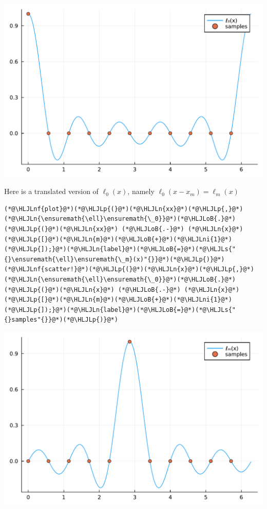 \documentclass[12pt,landscape]{article}
\newcommand{\HLJLn}[1]{#1}
\newcommand{\HLJLnf}[1]{\textcolor[RGB]{66,102,213}{#1}}
\newcommand{\HLJLs}[1]{\textcolor[RGB]{201,61,57}{#1}}
\newcommand{\HLJLni}[1]{\textcolor[RGB]{59,151,46}{#1}}
\newcommand{\HLJLoB}[1]{\textcolor[RGB]{102,102,102}{\textbf{#1}}}
\newcommand{\HLJLp}[1]{#1}
\begin{document}
{\includegraphics[width=\linewidth]{jl_qsW2Qg/Fourier_8_1.pdf}

Here is a translated version of $\ell_0(x)$, namely $\ell_0(x-x_{m}) = \ell_{m}(x)$


\begin{lstlisting}
(*@\HLJLnf{plot}@*)(*@\HLJLp{(}@*)(*@\HLJLn{xx}@*)(*@\HLJLp{,}@*)(*@\HLJLn{\ensuremath{\ell}\ensuremath{\_0}}@*)(*@\HLJLoB{.}@*)(*@\HLJLp{(}@*)(*@\HLJLn{xx}@*) (*@\HLJLoB{.-}@*) (*@\HLJLn{x}@*)(*@\HLJLp{[}@*)(*@\HLJLn{m}@*)(*@\HLJLoB{+}@*)(*@\HLJLni{1}@*)(*@\HLJLp{]);}@*)(*@\HLJLn{label}@*)(*@\HLJLoB{=}@*)(*@\HLJLs{"{}\ensuremath{\ell}\ensuremath{\_m}(x)"{}}@*)(*@\HLJLp{)}@*)
(*@\HLJLnf{scatter!}@*)(*@\HLJLp{(}@*)(*@\HLJLn{x}@*)(*@\HLJLp{,}@*)(*@\HLJLn{\ensuremath{\ell}\ensuremath{\_0}}@*)(*@\HLJLoB{.}@*)(*@\HLJLp{(}@*)(*@\HLJLn{x}@*) (*@\HLJLoB{.-}@*) (*@\HLJLn{x}@*)(*@\HLJLp{[}@*)(*@\HLJLn{m}@*)(*@\HLJLoB{+}@*)(*@\HLJLni{1}@*)(*@\HLJLp{]);}@*)(*@\HLJLn{label}@*)(*@\HLJLoB{=}@*)(*@\HLJLs{"{}samples"{}}@*)(*@\HLJLp{)}@*)
\end{lstlisting}

\includegraphics[width=\linewidth]{jl_qsW2Qg/Fourier_9_1.pdf}

}
\end{document}
